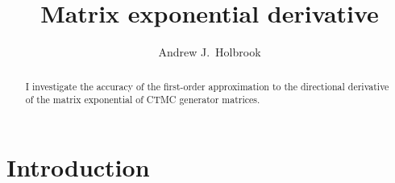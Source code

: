 \documentclass[12pt]{article} %
\title{Matrix exponential derivative}
\author{Andrew J.~Holbrook}
\affil{UCLA Biostatistics}
\begin{document}
\maketitle




\begin{abstract}

I investigate the accuracy of the first-order approximation to the directional derivative of the matrix exponential of CTMC generator matrices.


\end{abstract}



\section{Introduction}\label{sec:intro}


\newcommand{\QQ}{\mathbf{Q}}
\newcommand{\DD}{\mathbf{D}}
\newcommand{\MM}{\mathbf{M}}
\newcommand{\JJ}{\mathbf{J}}
\newcommand{\II}{\mathbf{I}}
\newcommand{\RR}{\mathbf{R}}
\newcommand{\Zero}{\boldsymbol{0}}
\newcommand{\ttheta}{\boldsymbol{\theta}}
\end{document}
